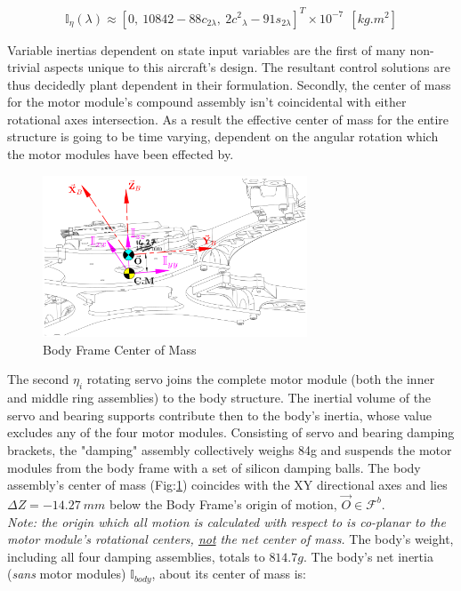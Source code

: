 \begin{equation}\label{eq:inertia.middle.vpa}
\mathbb{I}_\eta(\lambda)\approx[0,~ 10842-88{c}_{2\lambda},~ 2{c^2}_{\lambda}-91s_{2\lambda}]^T\times10^{-7}~~[kg.m^2]
\end{equation}
\par
Variable inertias dependent on state input variables are the first of many non-trivial aspects unique to this aircraft's design. The resultant control solutions are thus decidedly plant dependent in their formulation. Secondly, the center of mass for the motor module's compound assembly isn't coincidental with either rotational axes intersection. As a result the effective center of mass for the entire structure is going to be time varying, dependent on the angular rotation which the motor modules have been effected by.
\par
\begin{figure}[htbp]
\centering
\includegraphics[width=0.7\textwidth]{figs/inertia-center}
\caption{Body Frame Center of Mass}
\label{fig:inertia-center}
\end{figure}
The second $\eta_i$ rotating servo joins the complete motor module (both the inner and middle ring assemblies) to the body structure. The inertial volume of the servo and bearing supports contribute then to the body's inertia, whose value excludes any of the four motor modules. Consisting of servo and bearing damping brackets, the "damping" assembly collectively weighs 84g and suspends the motor modules from the body frame with a set of silicon damping balls. The body assembly's center of mass (Fig:\ref{fig:inertia-center}) coincides with the XY directional axes and lies $\Delta Z=-14.27~mm$ below the Body Frame's origin of motion, $\vec{O}\in\mathcal{F}^b$.
\\
\emph{\color{Gray}Note: the origin which all motion is calculated with respect to is co-planar to the motor module's rotational centers, \underline{not} the net center of mass.}
\newpage
The body's weight, including all four damping assemblies, totals to $814.7 g$. The body's net inertia (\emph{sans} motor modules) $\mathbb{I}_{body}$, about its center of mass is:
